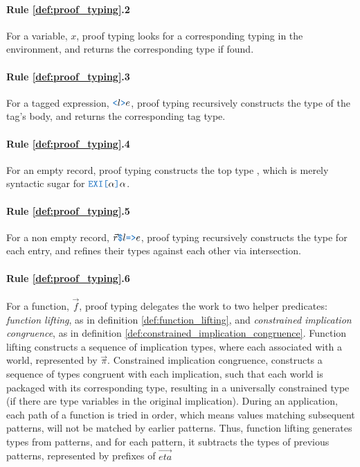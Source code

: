 \documentclass[acmsmall]{acmart}
\theoremstyle{definition}
\begin{document}
\paragraph{Rule \ref{def:proof_typing}.2}
For a variable, $x$, proof typing looks
for a corresponding typing in the environment, and returns the 
corresponding type if found.

\paragraph{Rule \ref{def:proof_typing}.3}
For a tagged expression, $\obj{<}l\obj{>}e$, proof typing recursively 
constructs the type of the tag's body,
and returns the corresponding tag type.

\paragraph{Rule \ref{def:proof_typing}.4}
For an empty record, proof typing constructs the top type ,
which is merely syntactic sugar for $\obj{EXI[}\alpha\obj{]}\alpha$.

\paragraph{Rule \ref{def:proof_typing}.5}
For a non empty record, $\vec{r}\obj{\$}l\obj{=>}e$, proof typing 
recursively constructs the type for each entry, and
refines their types against each other via intersection.

\paragraph{Rule \ref{def:proof_typing}.6}
For a function, $\vec{f}$, proof typing 
delegates the work to two helper predicates: \emph{function lifting}, as in definition \ref{def:function_lifting}, and
\emph{constrained implication congruence}, as in definition \ref{def:constrained_implication_congruence}.
Function lifting constructs a sequence of implication types, where each associated with a world, represented by $\vec{\pi}$.
Constrained implication congruence, constructs a sequence of types congruent with each implication,
such that each world is packaged with its corresponding type, resulting in a universally constrained type 
(if there are type variables in the original implication). 
During an application, each path of a function is tried in order, which means values matching subsequent
patterns, will not be matched by earlier patterns. Thus, function lifting generates types from patterns,
and for each pattern, it subtracts the types of previous patterns,
represented by prefixes of $\vec{eta}$
\end{document}
